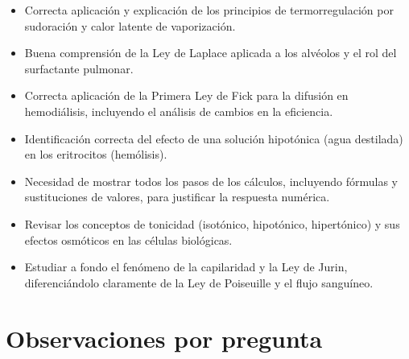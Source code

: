 \documentclass[11pt,a4paper]{article}
\begin{document}
\vspace{4pt}
\begin{minipage}[t]{0.48\linewidth}
  \begin{tcolorbox}[cajaFortaleza, title={Fortalezas}]
\begin{itemize}[leftmargin=1.5em, itemsep=2pt]
  \item Correcta aplicación y explicación de los principios de termorregulación por sudoración y calor latente de vaporización.
  \item Buena comprensión de la Ley de Laplace aplicada a los alvéolos y el rol del surfactante pulmonar.
  \item Correcta aplicación de la Primera Ley de Fick para la difusión en hemodiálisis, incluyendo el análisis de cambios en la eficiencia.
  \item Identificación correcta del efecto de una solución hipotónica (agua destilada) en los eritrocitos (hemólisis).
\end{itemize}
  \end{tcolorbox}
\end{minipage}
\hfill
\begin{minipage}[t]{0.48\linewidth}
  \begin{tcolorbox}[cajaMejora, title={Areas de mejora}]
\begin{itemize}[leftmargin=1.5em, itemsep=2pt]
  \item Necesidad de mostrar todos los pasos de los cálculos, incluyendo fórmulas y sustituciones de valores, para justificar la respuesta numérica.
  \item Revisar los conceptos de tonicidad (isotónico, hipotónico, hipertónico) y sus efectos osmóticos en las células biológicas.
  \item Estudiar a fondo el fenómeno de la capilaridad y la Ley de Jurin, diferenciándolo claramente de la Ley de Poiseuille y el flujo sanguíneo.
\end{itemize}
  \end{tcolorbox}
\end{minipage}

\section*{Observaciones por pregunta}
\end{document}

